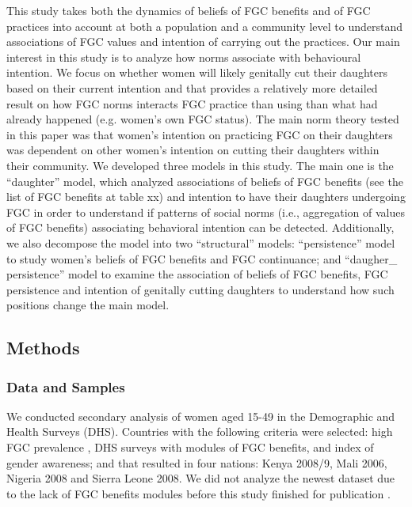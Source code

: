 \documentclass[12pt,]{article}
\begin{document}
This study takes both the dynamics of beliefs of FGC benefits and of FGC practices into account at both a population and a community level to understand associations of FGC values and intention of carrying out the practices.  Our main interest in this study is to analyze how norms associate with behavioural intention.  We focus on whether women will likely genitally cut their daughters based on their current intention and that provides a relatively more detailed result on how FGC norms interacts FGC practice than using than what had already happened (e.g. women’s own FGC status).  The main norm theory tested in this paper was that women’s intention on practicing FGC on their daughters was dependent on other women’s intention on cutting their daughters within their community.  We developed three models in this study.  The main one is the “daughter” model, which analyzed associations of beliefs of FGC benefits (see the list of FGC benefits at table xx) and intention to have their daughters undergoing FGC in order to understand if patterns of social norms (i.e., aggregation of values of FGC benefits) associating behavioral intention can be detected.  Additionally, we also decompose the model into two “structural” models:  “persistence” model to study women’s beliefs of FGC benefits and FGC continuance; and “daugher_ persistence” model to examine the association of beliefs of FGC benefits, FGC persistence and intention of genitally cutting daughters to understand how such positions change the main model.

\subsection{Methods}\label{methods}

\subsubsection{Data and Samples}\label{data-and-samples}

We conducted secondary analysis of women aged 15-49 in the Demographic and Health Surveys (DHS).  Countries with the following criteria were selected:  high FGC prevalence \cite{UNIC16}, DHS surveys with modules of FGC benefits, and index of gender awareness; and that resulted in four nations:  Kenya 2008/9, Mali 2006, Nigeria 2008 and Sierra Leone 2008.  We did not analyze the newest dataset due to the lack of FGC benefits modules before this study finished for publication .
\end{document}
